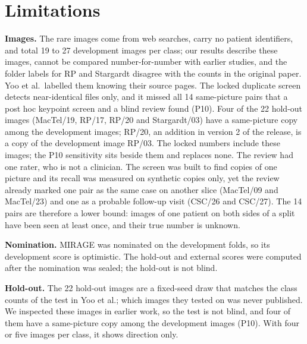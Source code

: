 \documentclass[conference]{IEEEtran}
\begin{document}
\section{Limitations}
\label{sec:limitations}
\textbf{Images.} The rare images come from web searches, carry no patient identifiers, and total 19 to 27 development images per class; our results describe these images, cannot be compared number-for-number with earlier studies, and the folder labels for RP and Stargardt disagree with the counts in the original paper. Yoo et al.\ labelled them knowing their source pages. The locked duplicate screen detects near-identical files only, and it missed all 14 same-picture pairs that a post hoc keypoint screen and a blind review found (P10). Four of the 22 hold-out images (MacTel/19, RP/17, RP/20 and Stargardt/03) have a same-picture copy among the development images; RP/20, an addition in version 2 of the release, is a copy of the development image RP/03. The locked numbers include these images; the P10 sensitivity sits beside them and replaces none. The review had one rater, who is not a clinician. The screen was built to find copies of one picture and its recall was measured on synthetic copies only, yet the review already marked one pair as the same case on another slice (MacTel/09 and MacTel/23) and one as a probable follow-up visit (CSC/26 and CSC/27). The 14 pairs are therefore a lower bound: images of one patient on both sides of a split have been seen at least once, and their true number is unknown.

\textbf{Nomination.} MIRAGE was nominated on the development folds, so its development score is optimistic. The hold-out and external scores were computed after the nomination was sealed; the hold-out is not blind.

\textbf{Hold-out.} The 22 hold-out images are a fixed-seed draw that matches the class counts of the test in Yoo et al.; which images they tested on was never published. We inspected these images in earlier work, so the test is not blind, and four of them have a same-picture copy among the development images (P10). With four or five images per class, it shows direction only.
\end{document}
